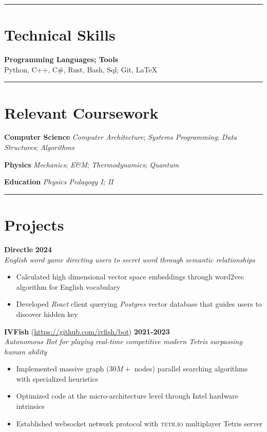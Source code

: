 \documentclass[11pt]{article}
\begin{document}
\rule{\textwidth}{0.1pt}
\vspace*{-10mm}

\section*{Technical Skills}
\vspace*{-1mm}

\textbf{Programming Languages; Tools} \\
Python, C++, C\#, Rust, Bash, Sql; Git, \LaTeX \\

\vspace*{-5mm}
\rule{\textwidth}{0.1pt}
\vspace*{-10mm}

\section*{Relevant Coursework}
\vspace*{-1mm}

\textbf{Computer Science}
\emph{Computer Architecture};
\emph{Systems Programming};
\emph{Data Structures};
\emph{Algorithms}

\textbf{Physics}
\emph{Mechanics};
\emph{E\&M};
\emph{Thermodynamics};
\emph{Quantum}

\textbf{Education}
\emph{Physics Pedagogy I; II}

\rule{\textwidth}{0.1pt}
\vspace*{-10mm}

\section*{Projects}
\vspace*{-1mm}

\textbf{Directle} \hfill \textbf{2024} \\
\emph{English word game directing users to secret word through semantic relationships}
\begin{itemize}
	\cramped
    \item Calculated high dimensional vector space embeddings through word2vec algorithm for English vocabulary
    \item Developed \emph{React} client querying \emph{Postgres} vector database that guides users to discover hidden key
\end{itemize}

\textbf{IVFish} (\url{https://github.com/ivfish/bot}) \hfill \textbf{2021-2023} \\
\emph{Autonomous Bot for playing real-time competitive modern Tetris surpassing human ability}
\begin{itemize}
	\cramped
    \item Implemented massive graph ($30M+$ nodes) parallel searching algorithms with specialized heuristics
    \item Optimized code at the micro-architecture level through Intel hardware intrinsics
    \item Established websocket network protocol with \textsc{tetr.io} multiplayer Tetris server
\end{itemize}
\end{document}
